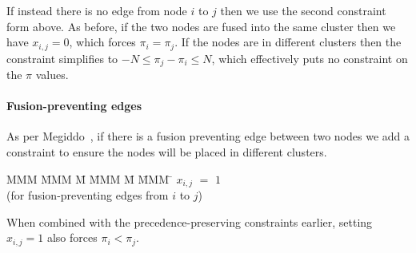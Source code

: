 If instead there is no edge from node $i$ to $j$ then we use the second constraint form above. As before, if the two nodes are fused into the same cluster then we have $x_{i,j} = 0$, which forces $\pi_i = \pi_j$. If the nodes are in different clusters then the constraint simplifies to $-N \le \pi_j - \pi_i \le N$, which effectively puts no constraint on the $\pi$ values.


\paragraph{Fusion-preventing edges} As per Megiddo~\cite{megiddo1998optimal}, if there is a fusion preventing edge between two nodes we add a constraint to ensure the nodes will be placed in different clusters.
\begin{tabbing}
MMM     \= MMM \= M  \= MMM \= M \= MMM \= \kill
        \> $x_{i,j}$ \> $=$ \> $1$ \>   \> \\
        \> (for fusion-preventing edges from $i$ to $j$) 
\end{tabbing}
When combined with the precedence-preserving constraints earlier, setting $x_{i,j} = 1$ also forces $\pi_i < \pi_j$. 



